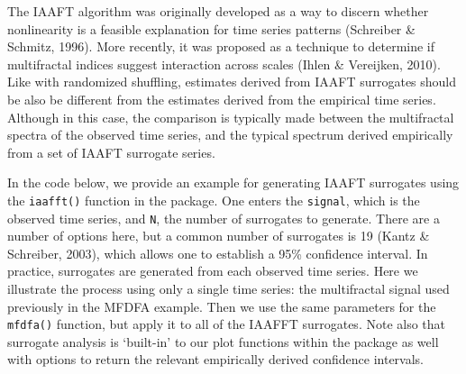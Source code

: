 \documentclass[
  man]{apa6}
\newenvironment{Shaded}{\begin{snugshade}}{\end{snugshade}}
\newcommand{\AttributeTok}[1]{\textcolor[rgb]{0.77,0.63,0.00}{#1}}
\newcommand{\DecValTok}[1]{\textcolor[rgb]{0.00,0.00,0.81}{#1}}
\newcommand{\FunctionTok}[1]{\textcolor[rgb]{0.00,0.00,0.00}{#1}}
\newcommand{\NormalTok}[1]{#1}
\newcommand{\OtherTok}[1]{\textcolor[rgb]{0.56,0.35,0.01}{#1}}
\newcommand{\SpecialCharTok}[1]{\textcolor[rgb]{0.00,0.00,0.00}{#1}}
\begin{document}
The IAAFT algorithm was originally developed as a way to discern whether
nonlinearity is a feasible explanation for time series patterns
(Schreiber \& Schmitz, 1996). More recently, it was proposed as a technique to
determine if multifractal indices suggest interaction across scales
(Ihlen \& Vereijken, 2010). Like with randomized shuffling, estimates derived from
IAAFT surrogates should be also be different from the estimates derived
from the empirical time series. Although in this case, the comparison is
typically made between the multifractal spectra of the observed time
series, and the typical spectrum derived empirically from a set of IAAFT
surrogate series.

In the code below, we provide an example for generating IAAFT surrogates
using the \texttt{iaafft()} function in the package. One enters the \texttt{signal},
which is the observed time series, and \texttt{N}, the number of surrogates to
generate. There are a number of options here, but a common number of
surrogates is 19 (Kantz \& Schreiber, 2003), which allows one to establish a 95\%
confidence interval. In practice, surrogates are generated from each
observed time series. Here we illustrate the process using only a single
time series: the multifractal signal used previously in the MFDFA
example. Then we use the same parameters for the \texttt{mfdfa()} function, but
apply it to all of the IAAFFT surrogates. Note also that surrogate
analysis is `built-in' to our plot functions within the package as well
with options to return the relevant empirically derived confidence
intervals.

\begin{Shaded}
\end{Shaded}
\end{document}
